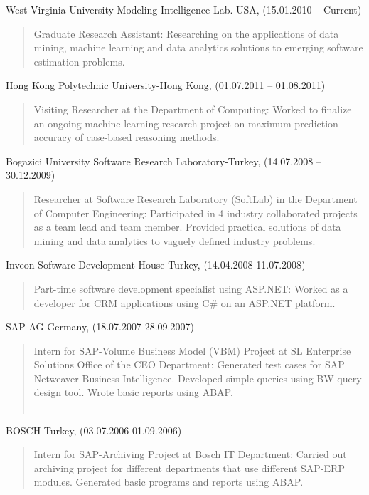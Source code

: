 \documentclass[margin]{res}
\begin{document}
\begin{resume}
\begin{list}{}{\leftmargin=0.5em}
\item West Virginia University Modeling Intelligence Lab.-USA, (15.01.2010 – Current) 
\begin{quote}
Graduate Research Assistant: Researching on the applications of data mining, machine learning and data analytics solutions to emerging software estimation problems.
\end{quote}

\item Hong Kong Polytechnic University-Hong Kong, (01.07.2011 – 01.08.2011) 
\begin{quote}
Visiting Researcher at the Department of Computing: Worked to finalize an ongoing machine learning research project on maximum prediction accuracy of case-based reasoning methods. 
\end{quote}

\item Bogazici University Software Research Laboratory-Turkey, (14.07.2008 – 30.12.2009) 
\begin{quote}
Researcher at Software Research Laboratory (SoftLab) in the Department of Computer Engineering: Participated in 4 industry collaborated projects as a team lead and team member. Provided practical solutions of data mining and data analytics to vaguely defined industry problems.
\end{quote}

\item Inveon Software Development House-Turkey, (14.04.2008-11.07.2008) 
\begin{quote}
Part-time software development specialist using ASP.NET: Worked as a developer for CRM applications using C\# on an ASP.NET platform.
\end{quote}

\item SAP AG-Germany, (18.07.2007-28.09.2007) 
\begin{quote}
Intern for SAP-Volume Business Model (VBM) Project at SL Enterprise Solutions Office of the CEO Department: Generated test cases for SAP Netweaver Business Intelligence. Developed simple queries using BW query design tool. Wrote basic reports using ABAP.\\\\
\end{quote}

\item BOSCH-Turkey, (03.07.2006-01.09.2006) 
\begin{quote}
Intern for SAP-Archiving Project at Bosch IT Department: Carried out archiving project for different departments that use different SAP-ERP modules. Generated basic programs and reports using ABAP.
\end{quote}


\end{list}
\end{resume}
\end{document}
